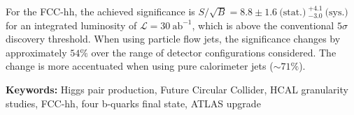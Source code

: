 For the FCC-hh, the achieved significance is $S/\sqrt{B}=8.8\pm 1.6~\text{(stat.)}~^{+4.1}_{-3.0}~\text{(sys.)}$ for an integrated luminosity of $\mathcal{L}=30~\text{ab}^{-1}$, which is above the conventional $5\sigma$ discovery threshold. When using particle flow jets, the significance changes by approximately $54\%$ over the range of detector configurations considered. The change is more accentuated when using pure calorimeter jets ($\sim 71\%$).

\vfill

\textbf{\Large Keywords:} Higgs pair production, Future Circular Collider, HCAL granularity studies, FCC-hh, four b-quarks final state, ATLAS upgrade

